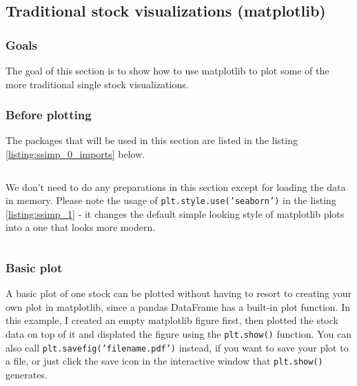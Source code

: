 \documentclass[12pt, a4paper]{article}
\begin{document}
\newpage
\subsection{Traditional stock visualizations (matplotlib)}
\subsubsection{Goals}
The goal of this section is to show how to use matplotlib to plot some of the more traditional single stock visualizations.

\subsubsection{Before plotting}


The packages that will be used in this section are listed in the listing \ref{listing:ssimp_0_imports} below.

\bgroup
  \inputminted[linenos, breaklines=true, fontsize=\scriptsize]{python}{src/stocks/simple/0_imports.py}
  \label{listing:ssimp_0_imports}
\egroup


We don't need to do any preparations in this section except for loading the data in memory. Please note the usage of \texttt{plt.style.use('seaborn')} in the listing \ref{listing:ssimp_1} - it changes the default simple looking style of matplotlib plots into a one that looks more modern.

\bgroup
  \inputminted[linenos, breaklines=true, fontsize=\scriptsize, firstnumber=last]{python}{src/stocks/simple/1_get_data.py}
  \label{listing:ssimp_1}
\egroup

\subsubsection{Basic plot}

A basic plot of one stock can be plotted without having to resort to creating your own plot in matplotlib, since a pandas DataFrame has a built-in plot function. In this example, I created an empty matplotlib figure first, then plotted the stock data on top of it and displated the figure using the \texttt{plt.show()} function. You can also call \texttt{plt.savefig('filename.pdf')} instead, if you want to save your plot to a file, or just click the save icon in the interactive window that \texttt{plt.show()} generates.
\end{document}

